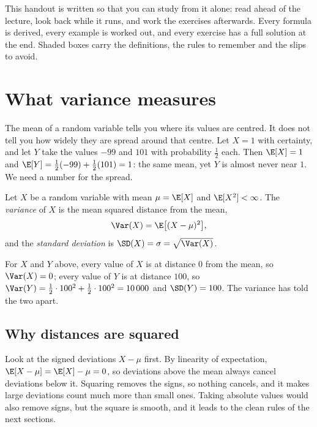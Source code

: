 
This handout is written so that you can study from it alone: read ahead of the lecture, look back while it runs, and work the exercises afterwards.
Every formula is derived, every example is worked out, and every exercise has a full solution at the end.
Shaded boxes carry the definitions, the rules to remember and the slips to avoid.

\section{What variance measures}

The mean of a random variable tells you where its values are centred. It does not tell you how widely they are spread around that centre. Let $X=1$ with
certainty, and let $Y$ take the values $-99$ and $101$ with probability $\tfrac12$ each. Then $\E[X]=1$ and $\E[Y]=\tfrac12(-99)+\tfrac12(101)=1$: the same
mean, yet $Y$ is almost never near $1$. We need a number for the spread.

\begin{definition}
Let $X$ be a random variable with mean $\mu=\E[X]$ and $\E[X^2]<\infty$. The \emph{variance} of $X$ is the mean squared distance from the mean,
\[
  \Var(X)=\E\bigl[(X-\mu)^2\bigr],
\]
and the \emph{standard deviation} is $\SD(X)=\sigma=\sqrt{\Var(X)}$.
\end{definition}

For $X$ and $Y$ above, every value of $X$ is at distance $0$ from the mean, so $\Var(X)=0$; every value of $Y$ is at distance $100$, so
$\Var(Y)=\tfrac12\cdot100^2+\tfrac12\cdot100^2=10\,000$ and $\SD(Y)=100$. The variance has told the two apart.

\subsection{Why distances are squared}

Look at the signed deviations $X-\mu$ first. By linearity of expectation, $\E[X-\mu]=\E[X]-\mu=0$, so deviations above the mean always cancel deviations below it.
Squaring removes the signs, so nothing cancels, and it makes large deviations count much more than small ones. Taking absolute values would also remove signs,
but the square is smooth, and it leads to the clean rules of the next sections.

